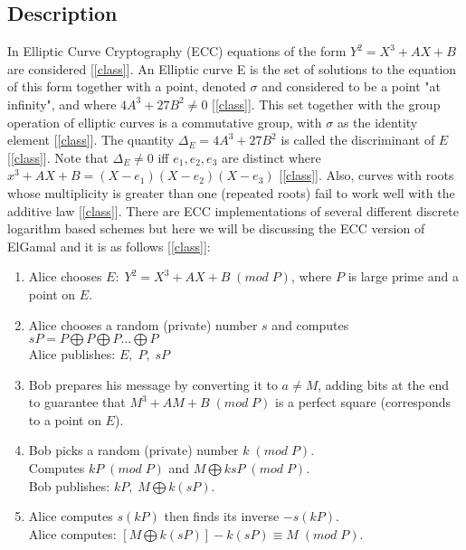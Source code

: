 \documentclass[12pt]{article}
\begin{document}
\subsection{Description}
In Elliptic Curve Cryptography (ECC) equations of the form $Y^2=X^3+AX+B$ are considered [\ref{class}]. An Elliptic curve E is the set of solutions to the equation of this form together with a point, denoted $\sigma$ and considered to be a point "at infinity", and where $4A^3+27B^2\neq0$ [\ref{class}]. This set together with the group operation of elliptic curves is a commutative group, with $\sigma$ as the identity element [\ref{class}]. The quantity $\Delta_E=4A^3+27B^2$ is called the discriminant of $E$ [\ref{class}]. Note that $\Delta_E \neq 0$ iff $e_1,e_2,e_3$ are distinct where $x^3+AX+B=(X-e_1)(X-e_2)(X-e_3)$ [\ref{class}]. Also, curves with roots whose multiplicity is greater than one (repeated roots) fail to work well with the additive law [\ref{class}]. There are ECC implementations of several different discrete logarithm based schemes but here we will be discussing the ECC version of ElGamal and it is as follows [\ref{class}]:\\ 
\begin{enumerate}
    \item Alice chooses $E:\;Y^2=X^3+AX+B\;(mod\;P)$, where $P$ is large prime and a point on $E$.
    \item Alice chooses a random (private) number $s$ and computes $sP=P\bigoplus P \bigoplus P...\bigoplus P$\\
    Alice publishes: $E,\;P,\;sP$
    \item Bob prepares his message by converting it to $a\neq M$, adding bits at the end to guarantee that $M^3+AM+B\;(mod\;P)$ is a perfect square (corresponds to a point on $E$).
    \item Bob picks a random (private) number $k\;(mod\;P)$.\\
    Computes $kP\;(mod\;P)$ and $M\bigoplus ksP\;(mod\;P)$.\\
    Bob publishes: $kP,\;M\bigoplus k(sP)$.
    \item Alice computes $s(kP)$ then finds its inverse $-s(kP)$.\\
    Alice computes: $[M\bigoplus k(sP)] - k(sP)\equiv M\;(mod\;P)$. 
\end{enumerate}
\end{document}
